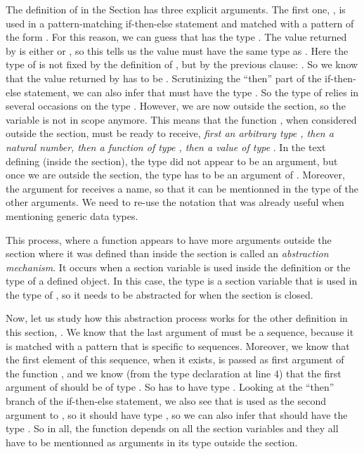 The definition of  in the Section has three explicit
arguments. The first one, , is used in
a pattern-matching if-then-else statement and matched with a pattern of the
form .  For this reason, we can guess that  has the type .
The value returned by  is either  or , so this
tells us the value must have the same type as .  Here the type of
 is not fixed by the definition of , but by the previous clause:
.  So we know that the value returned by 
has to be .  Scrutinizing the ``then'' part of the if-then-else statement,
we can also infer that  must have the type .  So the type
of  relies in several occasions on the type .  However, we are
now outside the section, so the variable  is not in
scope anymore.  This means that the function , when considered
outside the section, must be ready to receive, {\em first an arbitrary type
 , then a natural number, then a function of type , then a
value of type }.  In the text defining  (inside the section), the
type  did not appear to be an argument, but once we are outside
the section, the type  has to be an argument of .  Moreover,
the argument for  receives a name, so that it can be mentionned
in the type of the other arguments.  We need to re-use the 
notation that was already useful when mentioning generic data types.

This process, where a function appears to have more arguments outside
the section where it was defined than inside the section is called
an {\em abstraction mechanism}.
It occurs when a section variable is used inside the definition or
the type of a defined object.  In this case, the type  is a section
variable that is used in the type of , so it needs to be
abstracted for  when the section is closed.

Now, let us study how this abstraction process works for the other definition
in this section, .  We know that the last argument  of 
must be a sequence, because it is matched with a pattern that is specific
to sequences.  Moreover, we know that the first element of this sequence,
when it exists, is passed as first argument of the function , and
we know (from the type declaration at line 4) that the first argument of
 should be of type .  So  has to have type .
Looking at the ``then'' branch of the if-then-else statement, we also see
that  is used as the second argument to , so it should
have type , so we can also infer that  should have the type .
So in all, the function  depends on all the section variables and
they all have to be mentionned as arguments in its type outside the section.

